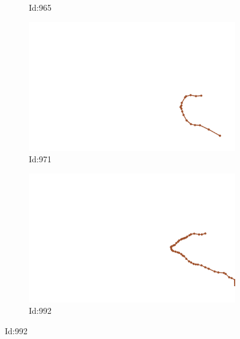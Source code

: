 \documentclass[12pt,twoside]{report}
\begin{document}
\begin{figure}
\begin{subfigure}[b]{0.20\textwidth}
\caption{Id:965}
\end{subfigure}
\begin{subfigure}[b]{0.20\textwidth}
\centering
\includegraphics[width=\textwidth]{../trajectories/971.png}
\caption{Id:971}
\end{subfigure}
\begin{subfigure}[b]{0.20\textwidth}
\centering
\includegraphics[width=\textwidth]{../trajectories/992.png}
\caption{Id:992}
\end{subfigure}
\end{figure}
\end{document}

